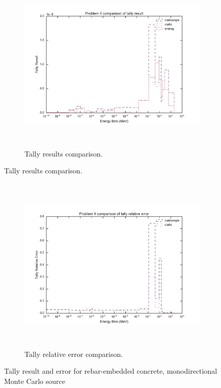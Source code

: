 \begin{figure}[ht!]
  \centering
  \begin{subfigure}[t]{\textwidth}
    \centering
    \includegraphics[height=8.5cm]{./chapters/characterization_probs/figures/char/prob_4/problem_4_tally_result_compare.pdf}
  \caption[Tally results comparison.]
  {Tally results comparison.}
    \label{fig:rebarresult}
  \end{subfigure}
\end{figure}
\begin{figure}[htb!]\ContinuedFloat
  \centering
  \begin{subfigure}[t]{\textwidth}
    \centering
    \includegraphics[height=8.5cm]{./chapters/characterization_probs/figures/char/prob_4/problem_4_tally_error_compare.pdf}
  \caption[Tally relative error comparison.]
  {Tally relative error comparison.}
    \label{fig:rebarerror}
  \end{subfigure}
\caption[Tally result and error for rebar-embedded concrete, monodirectional
Monte Carlo source]{Tally result and error for rebar-embedded concrete, monodirectional
  Monte Carlo source}
\label{fig:monorebarresults}
\end{figure}

